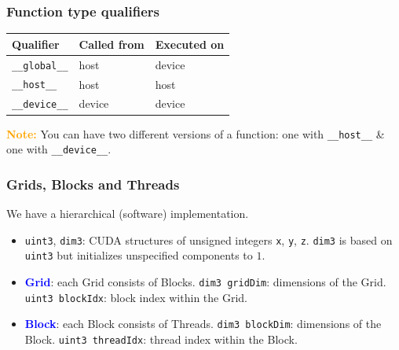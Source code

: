 \begin{frame}
  \frametitle{Function type qualifiers}
  \begin{center}
    \begin{tabular}{l|l|l}
      Qualifier                & Called from & Executed on \\
      \hline
      \texttt{\_\_global\_\_} & host        & device      \\
      \texttt{\_\_host\_\_}   & host        & host        \\
      \texttt{\_\_device\_\_} & device      & device      \\
      \hline
    \end{tabular}
  \end{center}
  \textbf{\textcolor{orange}{Note:}}
  You can have two different versions of a function:
  one with \texttt{\_\_host\_\_} \& one with \texttt{\_\_device\_\_}.
\end{frame}

\begin{frame}
  \frametitle{Grids, Blocks and Threads}
  We have a hierarchical (software) implementation.
  \begin{itemize}
    \item \texttt{uint3}, \texttt{dim3}:
          CUDA structures of unsigned integers \texttt{x}, \texttt{y}, \texttt{z}.
          \texttt{dim3} is based on \texttt{uint3} but initializes unspecified
          components to $1$.
    \item \textbf{\textcolor{blue}{Grid}}: each Grid consists of Blocks.
          \texttt{dim3 gridDim}: dimensions of the Grid.
          \texttt{uint3 blockIdx}: block index within the Grid.
    \item \textbf{\textcolor{blue}{Block}}: each Block consists of Threads.
          \texttt{dim3 blockDim}: dimensions of the Block.
          \texttt{uint3 threadIdx}: thread index within the Block.
  \end{itemize}
\end{frame}
